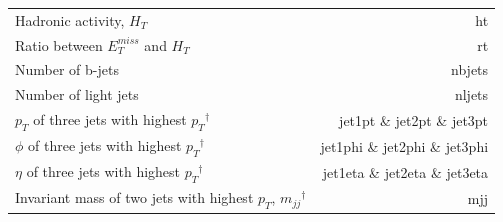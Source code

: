 \documentclass[14pt, a4paper]{book}
\begin{document}
\begin{table}[!h]
\begin{tabular}{l|r}
        Hadronic activity, $H_T$                                                        & ht\\
        Ratio between $E_T^{miss}$ and $H_T$                                            & rt\\
        Number of b-jets                                                                & nbjets         \\
        Number of light jets                                                            & nljets         \\
        $p_T$ of three jets with highest $p_T$$^\dagger$                                & jet1pt \& jet2pt \& jet3pt\\
        $\phi$ of three jets with highest $p_T$$^\dagger$                               & jet1phi \& jet2phi \& jet3phi\\
        $\eta$ of three jets with highest $p_T$$^\dagger$                               & jet1eta \& jet2eta \& jet3eta\\
        Invariant mass of two jets with highest $p_T$, $m_{jj}$$^\dagger$               & mjj\\\midrule\midrule
    \end{tabular}
    \label{tab:variables}
\end{table}
\end{document}
